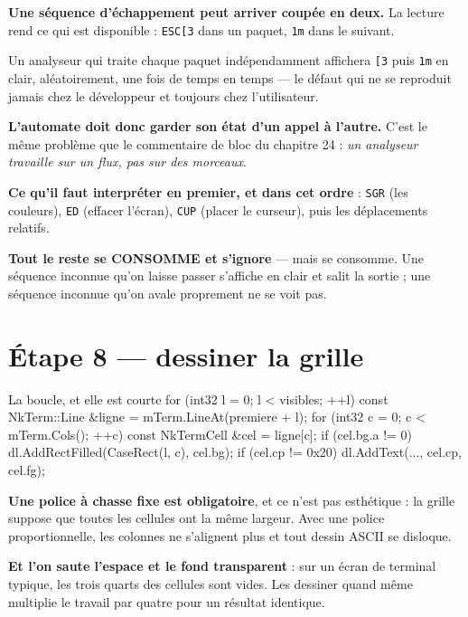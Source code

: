 \begin{nkpiege}
\textbf{Une séquence d'échappement peut arriver coupée en deux.} La lecture rend
ce qui est disponible : \texttt{ESC[3} dans un paquet, \texttt{1m} dans le
suivant.

Un analyseur qui traite chaque paquet indépendamment affichera \texttt{[3} puis
\texttt{1m} en clair, aléatoirement, une fois de temps en temps --- le défaut qui
ne se reproduit jamais chez le développeur et toujours chez l'utilisateur.

\textbf{L'automate doit donc garder son état d'un appel à l'autre.} C'est le même
problème que le commentaire de bloc du chapitre 24 : \emph{un analyseur travaille
sur un flux, pas sur des morceaux}.
\end{nkpiege}

\begin{nkretenir}
\textbf{Ce qu'il faut interpréter en premier, et dans cet ordre} :
\texttt{SGR} (les couleurs), \texttt{ED} (effacer l'écran), \texttt{CUP} (placer
le curseur), puis les déplacements relatifs.

\textbf{Tout le reste se CONSOMME et s'ignore} --- mais se consomme. Une séquence
inconnue qu'on laisse passer s'affiche en clair et salit la sortie ; une séquence
inconnue qu'on avale proprement ne se voit pas.
\end{nkretenir}

\section{Étape 8 --- dessiner la grille}

\begin{nkcode}{La boucle, et elle est courte}
for (int32 l = 0; l < visibles; ++l) {
    const NkTerm::Line &ligne = mTerm.LineAt(premiere + l);
    for (int32 c = 0; c < mTerm.Cols(); ++c) {
        const NkTermCell &cel = ligne[c];
        if (cel.bg.a != 0) { dl.AddRectFilled(CaseRect(l, c), cel.bg); }
        if (cel.cp != 0x20) { dl.AddText(..., cel.cp, cel.fg); }
    }
}
\end{nkcode}

\begin{nkretenir}
\textbf{Une police à chasse fixe est obligatoire}, et ce n'est pas esthétique :
la grille suppose que toutes les cellules ont la même largeur. Avec une police
proportionnelle, les colonnes ne s'alignent plus et tout dessin ASCII se
disloque.

\textbf{Et l'on saute l'espace et le fond transparent} : sur un écran de terminal
typique, les trois quarts des cellules sont vides. Les dessiner quand même
multiplie le travail par quatre pour un résultat identique.
\end{nkretenir}

